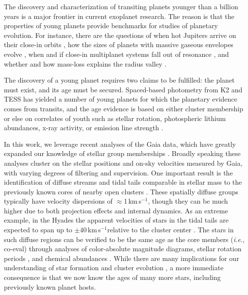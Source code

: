 \documentclass[12pt,twocolumn,linenumbers]{aastex63}
\newcommand{\kms}{\,km\,s$^{-1}$}
\begin{document}
The discovery and characterization of transiting planets younger than
a billion years is a major frontier in current exoplanet research.
The reason is that the properties of young planets provide benchmarks
for studies of planetary evolution.  For instance, there are the
questions of when hot Jupiters arrive on their close-in orbits
\citep{dawson_johnson_2018}, how the sizes of planets with massive
gaseous envelopes evolve \citep{rizzuto_tess_2020}, when and if
close-in multiplanet systems fall out of resonance
\citep{arevalo_stability_2022,goldberg_architectures_2022}, and
whether and how mass-loss explains the radius valley
\citep{lopez_how_2012,Owen_Wu_2013,Fulton_et_al_2017,ginzburg_corepowered_2018,lee_primordial_2021}.

The discovery of a young planet requires two claims to be fulfilled:
the planet must exist, and its age must be secured.  Spaced-based
photometry from K2 and TESS has yielded a number of young planets for
which the planetary evidence comes from transits, and the age evidence
is based on either cluster membership \citep[{\it
e.g.},]{Mann_et_al_2017,david_four_2019,newton_tess_2019,bouma_cluster_2020,nardiello_pathosII_2020}
or else on correlates of youth such as stellar rotation, photospheric
lithium abundances, x-ray activity, or emission line strength
\citep[{\it e.g.},]{zhou_2021_tois,hedges_toi-2076_2021}.

In this work, we leverage recent analyses of the Gaia data, which have
greatly expanded our knowledge of stellar group memberships
\citep[{\it e.g.},][]{CantatGaudin2018a,KounkelCovey2019,Kerr2021}.
Broadly speaking these analyses cluster on the stellar positions and
on-sky velocities measured by Gaia, with varying degrees of filtering
and supervision.  One important result is the identification of
diffuse streams and tidal tails comparable in stellar mass to the
previously known cores of nearby open clusters
\citep{meingast_psceri_2019,Meingast2021,gagne_number_2021}.  These
spatially diffuse groups typically have velocity dispersions of
$\approx$1\kms, though they can be much higher due to both projection
effects and internal dynamics.  As an extreme example, in the Hyades
the apparent velocities of stars in the tidal tails are expected to
span up to $\pm 40$\kms relative to the cluster center
\citep{jerabkova_800_2021}.  The stars in such diffuse regions can be
verified to be the same age as the core members ({\it i.e.}, co-eval)
through analyses of color-absolute magnitude diagrams, stellar
rotation periods \citep{curtis_tess_2019,bouma_2021_ngc2516}, and
chemical abundances \citep{hawkins_2020}.  While there are many
implications for our understanding of star formation and cluster
evolution \citep[{\it e.g.}][]{dinnbier_tidal_2020}, a more immediate
consequence is that we now know the ages of many more stars, including
previously known planet hosts.
\end{document}
